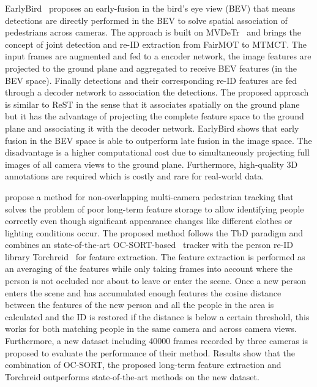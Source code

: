EarlyBird~\cite{Teepe23} proposes an early-fusion in the bird's eye view (BEV) that means detections are directly performed in the BEV to solve spatial association of pedestrians across cameras. The approach is built on MVDeTr~\cite{Hou21} and brings the concept of joint detection and re-ID extraction from FairMOT to MTMCT. The input frames are augmented and fed to a encoder network, the image features are projected to the ground plane and aggregated to receive BEV features (in the BEV space). Finally detections and their corresponding re-ID features are fed through a decoder network to association the detections. The proposed approach is similar to ReST in the sense that it associates spatially on the ground plane but it has the advantage of projecting the complete feature space to the ground plane and associating it with the decoder network. EarlyBird shows that early fusion in the BEV space is able to outperform late fusion in the image space. The disadvantage is a higher computational cost due to simultaneously projecting full images of all camera views to the ground plane. Furthermore, high-quality 3D annotations are required which is costly and rare for real-world data.

\citeauthor{Huang23a} propose a method for non-overlapping multi-camera pedestrian tracking that solves the problem of poor long-term feature storage to allow identifying people correctly even though significant appearance changes like different clothes or lighting conditions occur. The proposed method follows the TbD paradigm and combines an state-of-the-art OC-SORT-based~\cite{Cao23} tracker with the person re-ID library Torchreid~\cite{Zhou19} for feature extraction. The feature extraction is performed as an averaging of the features while only taking frames into account where the person is not occluded nor about to leave or enter the scene. Once a new person enters the scene and has accumulated enough features the cosine distance between the features of the new person and all the people in the area is calculated and the ID is restored if the distance is below a certain threshold, this works for both matching people in the same camera and across camera views. Furthermore, a new dataset including 40000 frames recorded by three cameras is proposed to evaluate the performance of their method. Results show that the combination of OC-SORT, the proposed long-term feature extraction and Torchreid outperforms state-of-the-art methods on the new dataset.

